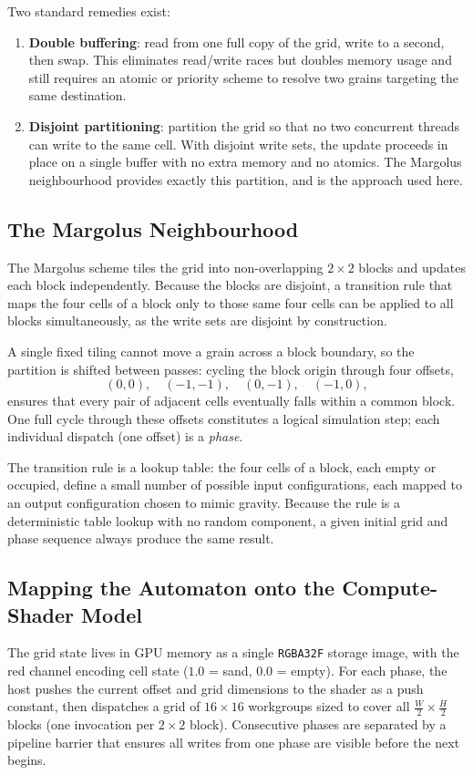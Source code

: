 \documentclass[oneside, a4paper, onecolumn, 11pt]{article}
\begin{document}
Two standard remedies exist:
\begin{enumerate}
    \item \textbf{Double buffering}: read from one full copy of the grid, write to a second, then swap. This eliminates read/write races but doubles memory usage and still requires an atomic or priority scheme to resolve two grains targeting the same destination.
    \item \textbf{Disjoint partitioning}: partition the grid so that no two concurrent threads can write to the same cell. With disjoint write sets, the update proceeds in place on a single buffer with no extra memory and no atomics. The Margolus neighbourhood provides exactly this partition, and is the approach used here.
\end{enumerate}

\subsection{The Margolus Neighbourhood}

The Margolus scheme tiles the grid into non-overlapping $2\times 2$ blocks and updates each block independently.
Because the blocks are disjoint, a transition rule that maps the four cells of a block only to those same four cells can be applied to all blocks simultaneously, as the write sets are disjoint by construction.

A single fixed tiling cannot move a grain across a block boundary, so the partition is shifted between passes: cycling the block origin through four offsets,
\[
  (0,0),\quad (-1,-1),\quad (0,-1),\quad (-1,0),
\]
ensures that every pair of adjacent cells eventually falls within a common block.
One full cycle through these offsets constitutes a logical simulation step; each individual dispatch (one offset) is a \emph{phase}.

The transition rule is a lookup table: the four cells of a block, each empty or occupied, define a small number of possible input configurations, each mapped to an output configuration chosen to mimic gravity.
Because the rule is a deterministic table lookup with no random component, a given initial grid and phase sequence always produce the same result.

\subsection{Mapping the Automaton onto the Compute-Shader Model}

The grid state lives in GPU memory as a single \texttt{RGBA32F} storage image, with the red channel encoding cell state ($1.0$ = sand, $0.0$ = empty).
For each phase, the host pushes the current offset and grid dimensions to the shader as a push constant, then dispatches a grid of $16\times16$ workgroups sized to cover all $\frac{W}{2} \times \frac{H}{2}$ blocks (one invocation per $2\times2$ block).
Consecutive phases are separated by a pipeline barrier that ensures all writes from one phase are visible before the next begins.
\end{document}
